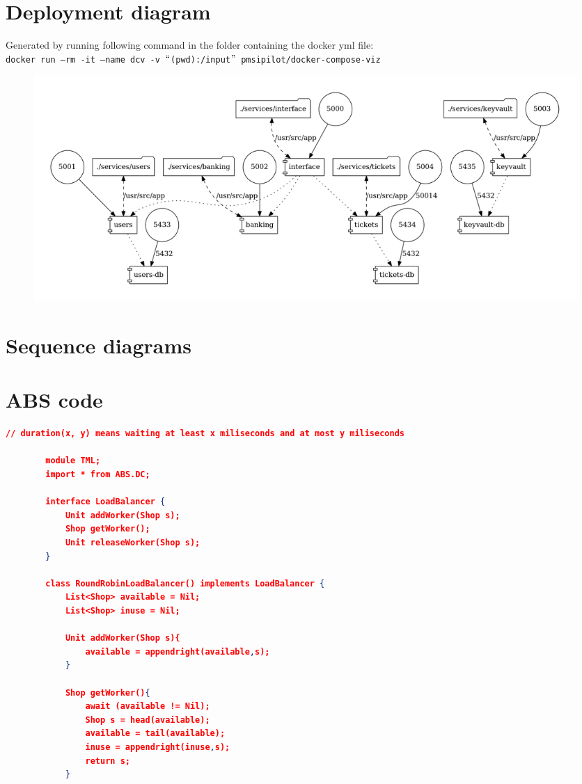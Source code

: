 \documentclass[10pt,a4paper,twocolumn]{article}
\begin{document}
\begin{appendices}
	\section{Deployment diagram}
	Generated by running following command in the folder containing the docker yml file: \\
	\texttt{docker run --rm -it --name dcv -v $``$(pwd):/input$"$ pmsipilot/docker-compose-viz}\\
	\begin{figure}[h]
		\includegraphics*[scale=0.3]{docker-compose.png}
	\end{figure}
	
	\clearpage
	\newpage
	\section{Sequence diagrams}
	
	\clearpage
	\newpage
	\section{ABS code}
	\label{appendix:abscode}
	\begin{lstlisting}[language=json]
		// duration(x, y) means waiting at least x miliseconds and at most y miliseconds
		
		module TML;
		import * from ABS.DC;
		
		interface LoadBalancer {
			Unit addWorker(Shop s);
			Shop getWorker();
			Unit releaseWorker(Shop s);
		}
		
		class RoundRobinLoadBalancer() implements LoadBalancer {
			List<Shop> available = Nil; 
			List<Shop> inuse = Nil;
			
			Unit addWorker(Shop s){
				available = appendright(available,s);
			}
			
			Shop getWorker(){
				await (available != Nil);
				Shop s = head(available); 
				available = tail(available); 
				inuse = appendright(inuse,s);
				return s;
			}
		

\end{lstlisting}
\end{appendices}
\end{document}
